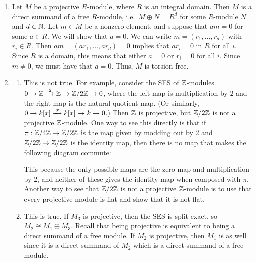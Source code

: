 \begin{solution}
\begin{enumerate}
    \item Let $M$ be a projective $R$-module, where $R$ is an integral domain. Then $M$ is a direct summand of a free $R$-module, i.e.\ $M \oplus N = R^d$ for some $R$-module $N$ and $d \in \mathbb{N}$. Let $m \in M$ be a nonzero element, and suppose that $am=0$ for some $a \in R$. We will show that $a=0$. We can write $m=(r_1,\dots,r_d)$ with $r_i \in R$. Then $am=(ar_1,\dots,ar_d)=0$ implies that $ar_i=0$ in $R$ for all $i$. Since $R$ is a domain, this means that either $a=0$ or $r_i=0$ for all $i$. Since $m\neq 0$, we must have that $a=0$. Thus, $M$ is torsion free.
    \item 
    \begin{enumerate}
        \item[(i)] This is not true. For example, consider the SES of $\mathbb{Z}$-modules $0 \to \mathbb{Z} \xrightarrow{\cdot 2} \mathbb{Z} \to \mathbb{Z}/2\mathbb{Z} \to 0$, where the left map is multiplication by $2$ and the right map is the natural quotient map. (Or similarly, $0 \to k[x] \xrightarrow{\cdot x} k[x] \to k \to 0$.) Then $\mathbb{Z}$ is projective, but $\mathbb{Z}/2\mathbb{Z}$ is not a projective $\mathbb{Z}$-module. One way to see this directly is that if $\pi: \mathbb{Z}/4\mathbb{Z} \to \mathbb{Z}/2\mathbb{Z}$ is the map given by modding out by 2 and $\mathbb{Z}/2\mathbb{Z} \to \mathbb{Z}/2\mathbb{Z}$ is the identity map, then there is no map that makes the following diagram commute:
        \begin{center}
        \end{center}
        This because the only possible maps are the zero map and multiplication by $2$, and neither of these gives the identity map when composed with $\pi$. Another way to see that $\mathbb{Z}/2\mathbb{Z}$ is not a projective $\mathbb{Z}$-module is to use that every projective module is flat and show that it is not flat.
    
        \item[(ii)] This is true. If $M_3$ is projective, then the SES is split exact, so $M_2 \cong M_1 \oplus M_3$. Recall that being projective is equivalent to being a direct summand of a free module. If $M_2$ is projective, then $M_1$ is as well since it is a direct summand of $M_2$ which is a direct summand of a free module.
    \end{enumerate}
\end{enumerate}
\end{solution}

